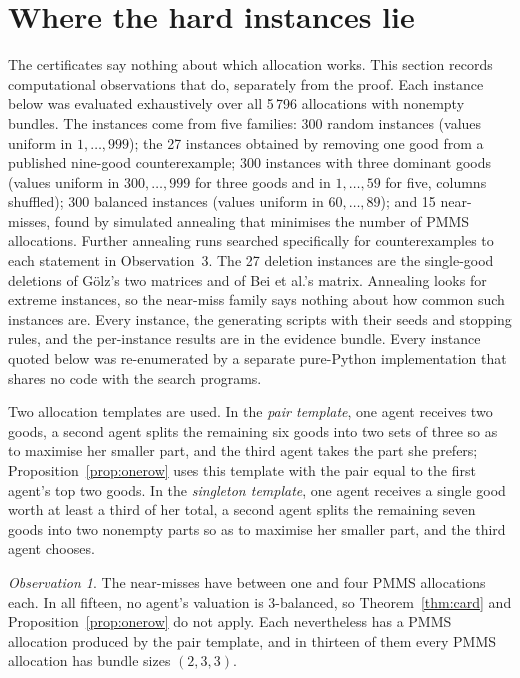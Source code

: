 \documentclass[11pt,a4paper]{article}
\theoremstyle{remark}
\newtheorem{observation}{Observation}
\begin{document}
\section{Where the hard instances lie}\label{sec:structure}

The certificates say nothing about which allocation works. This section records computational observations that do, separately from the proof. Each instance below was evaluated exhaustively over all 5\,796 allocations with nonempty bundles. The instances come from five families: 300 random instances (values uniform in $1,\dots,999$); the 27 instances obtained by removing one good from a published nine-good counterexample; 300 instances with three dominant goods (values uniform in $300,\dots,999$ for three goods and in $1,\dots,59$ for five, columns shuffled); 300 balanced instances (values uniform in $60,\dots,89$); and 15 near-misses, found by simulated annealing that minimises the number of PMMS allocations. Further annealing runs searched specifically for counterexamples to each statement in Observation~3. The 27 deletion instances are the single-good deletions of G\"olz's two matrices and of Bei et al.'s matrix. Annealing looks for extreme instances, so the near-miss family says nothing about how common such instances are. Every instance, the generating scripts with their seeds and stopping rules, and the per-instance results are in the evidence bundle. Every instance quoted below was re-enumerated by a separate pure-Python implementation that shares no code with the search programs.

Two allocation templates are used. In the \emph{pair template}, one agent receives two goods, a second agent splits the remaining six goods into two sets of three so as to maximise her smaller part, and the third agent takes the part she prefers; Proposition~\ref{prop:onerow} uses this template with the pair equal to the first agent's top two goods. In the \emph{singleton template}, one agent receives a single good worth at least a third of her total, a second agent splits the remaining seven goods into two nonempty parts so as to maximise her smaller part, and the third agent chooses.

\begin{observation}
The near-misses have between one and four PMMS allocations each. In all fifteen, no agent's valuation is $3$-balanced, so Theorem~\ref{thm:card} and Proposition~\ref{prop:onerow} do not apply. Each nevertheless has a PMMS allocation produced by the pair template, and in thirteen of them every PMMS allocation has bundle sizes $(2,3,3)$.
\end{observation}
\end{document}
